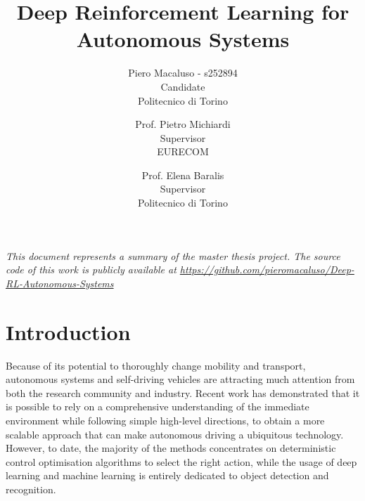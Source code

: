 \documentclass[10pt,twocolumn,letterpaper]{article}
\begin{document}
\title{Deep Reinforcement Learning for Autonomous Systems}

\author{Piero Macaluso - s252894\\
    Candidate\\
    Politecnico di Torino\\
    \and
    Prof. Pietro Michiardi\\
    Supervisor\\
    EURECOM\\
    \and
    Prof. Elena Baralis\\
    Supervisor\\
    Politecnico di Torino\\
}

\maketitle


\textit{This document represents a summary of the master thesis project.
    The source code of this work is publicly available at \url{https://github.com/pieromacaluso/Deep-RL-Autonomous-Systems}}
\section{Introduction}

Because of its potential to thoroughly change mobility and transport, autonomous systems and self-driving vehicles are attracting much attention from both the research community and industry.
Recent work has demonstrated that it is possible to rely on a comprehensive understanding of the immediate environment while following simple high-level directions, to obtain a more scalable approach that can make autonomous driving a ubiquitous technology.
However, to date, the majority of the methods concentrates on deterministic control optimisation algorithms to select the right action, while the usage of deep learning and machine learning is entirely dedicated to object detection and recognition.
\end{document}
